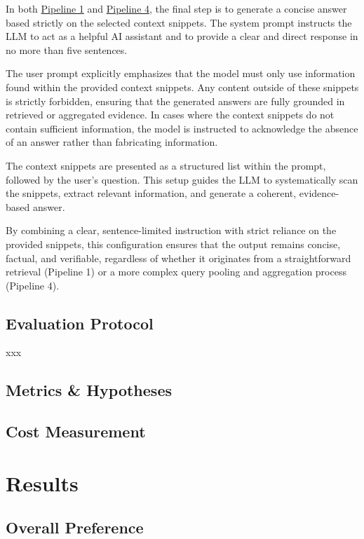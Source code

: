 \documentclass[manuscript,screen]{acmart}
\begin{document}
\begin{CCSXML}
		In both \hyperref[fig:pipeline1]{Pipeline 1} and \hyperref[fig:pipeline4]{Pipeline 4}, the final step is to generate a concise answer based strictly on the selected context snippets. The system prompt instructs the LLM to act as a helpful AI assistant and to provide a clear and direct response in no more than five sentences.
		
		The user prompt explicitly emphasizes that the model must only use information found within the provided context snippets. Any content outside of these snippets is strictly forbidden, ensuring that the generated answers are fully grounded in retrieved or aggregated evidence. In cases where the context snippets do not contain sufficient information, the model is instructed to acknowledge the absence of an answer rather than fabricating information.
		
		The context snippets are presented as a structured list within the prompt, followed by the user’s question. This setup guides the LLM to systematically scan the snippets, extract relevant information, and generate a coherent, evidence-based answer.
		
		By combining a clear, sentence-limited instruction with strict reliance on the provided snippets, this configuration ensures that the output remains concise, factual, and verifiable, regardless of whether it originates from a straightforward retrieval (Pipeline 1) or a more complex query pooling and aggregation process (Pipeline 4).
	
	\subsection{Evaluation Protocol}
	\label{subsec:eval-protocol}
	xxx
	
	\subsection{Metrics \& Hypotheses}
	\label{subsec:metrics-hypo}
	
		
	\subsection{Cost Measurement}
	\label{subsec:cost-measure}
	
	
\section{Results}
\label{sec:results}

	\subsection{Overall Preference}
	\label{subsec:preference}
	

\end{CCSXML}
\end{document}
